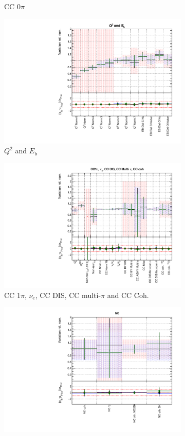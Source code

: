 \begin{figure}[!htbp]
\begin{subfigure}{0.49\textwidth}
  \caption{CC 0$\pi$}
\end{subfigure}
\begin{subfigure}{0.49\textwidth}
  \centering
  \includegraphics[width=0.9\linewidth]{figs/polyasmvsxsec_2}
  \caption{$Q^2$ and $E_{\mathrm{b}}$}
\end{subfigure}
\begin{subfigure}{0.49\textwidth}
  \centering
  \includegraphics[width=0.9\linewidth]{figs/polyasmvsxsec_3}
  \caption{CC 1$\pi$, $\nu_e$, CC DIS, CC multi-$\pi$ and CC Coh.}
\end{subfigure}
\begin{subfigure}{0.49\textwidth}
  \centering
  \includegraphics[width=0.9\linewidth]{figs/polyasmvsxsec_4}

\end{subfigure}
\end{figure}
